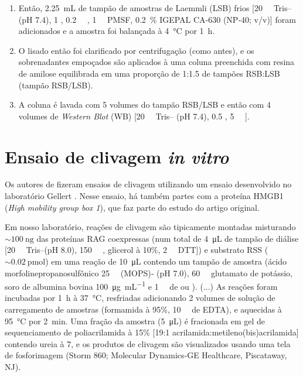 \documentclass[
	12pt,				%
	openright,			%
	twoside,			%
	a4paper,			%
	]{abntex2}
\begin{document}
\begin{enumerate}[label=\roman*.]
	\item Então, \SI{2.25}{\milli\liter} de tampão de amostras de Laemmli (LSB) frios [\SI{20}{\milli\molar} Tris– (pH \num{7.4}), \SI{1}{\molar} , \SI{0.2}{\milli\molar} , \SI{1}{\milli\molar} PMSF, \SI{0.2}{\percent} IGEPAL CA‐630 (NP‐40; v/v)] foram adicionados e a amostra foi balançada à \SI{4}{\degreeCelsius} por \SI{1}{\hour}.
	\item O lisado então foi clarificado por centrifugação (como antes), e os sobrenadantes empoçados são aplicados à uma coluna preenchida com resina de amilose equilibrada em uma proporção de 1:\num{1.5} de tampões RSB:LSB (tampão RSB/LSB).
	\item A coluna é lavada com 5 volumes do tampão RSB/LSB e então com 4 volumes de \textit{Western Blot} (WB) [\SI{20}{\milli\molar} Tris– (pH \num{7.4}), \SI{0.5}{\molar} , \SI{5}{\milli\molar} ].
\end{enumerate}

\section{Ensaio de clivagem \textit{in vitro}}

Os autores de  fizeram ensaios de clivagem utilizando um ensaio desenvolvido no laboratório Gellert \cite{refcleavage}. Nesse ensaio, há também partes com a proteína HMGB1 (\textit{High mobility group box 1}), que faz parte do estudo do artigo original.

\begin{quoting}[begintext={``},endtext={''\ (tradução livre)}]
	Em nosso laboratório, reações de clivagem são tipicamente montadas misturando $ \sim\SI{100}{\nano\gram} $ das proteínas RAG coexpressas (num total de \SI{4}{\micro\liter} de tampão de diálise [\SI{20}{\milli\molar} Tris–\ce (pH \num{8.0}), \SI{150}{\milli\molar} , glicerol à 10\%, \SI{2}{\milli\molar} DTT]) e substrato RSS ($ \sim\SI{0.02}{\pico\mol} $) em uma reação de \SI{10}{\micro\liter} contendo um tampão de amostra (ácido morfolinepropanosulfônico \SI{25}{\milli\molar} (MOPS)‐ (pH \num{7.0}), \SI{60}{\milli\molar} glutamato de potássio, soro de albumina bovina \SI{100}{\micro\gram\per\milli\liter} e \SI{1}{\milli\molar} de  ou ). (...) As reações foram incubadas por \SI{1}{\hour} à \SI{37}{\degreeCelsius}, resfriadas adicionando 2 volumes de solução de carregamento de amostras (formamida à 95\%, \SI{10}{\milli\molar} de EDTA), e aquecidas à \SI{95}{\degreeCelsius} por \SI{2}{\minute}. Uma fração da amostra (\SI{5}{\micro\liter}) é fracionada em gel de sequenciamento de poliacrilamida à 15\% [19:1 acrilamida:metileno(bis)acrilamida] contendo ureia à \SI{7}{\molar}, e os produtos de clivagem são visualizados usando uma tela de fosforimagem (Storm 860; Molecular Dynamics‐GE Healthcare, Piscataway, NJ).
\end{quoting}
\end{document}
